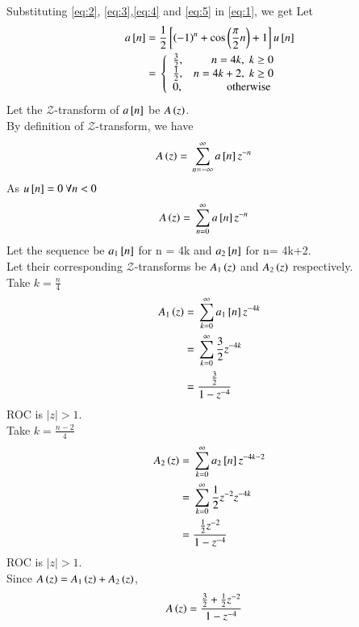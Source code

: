 \documentclass[journal,12pt,twocolumn]{IEEEtran}
\begin{document}
Substituting \eqref{eq:2}, \eqref{eq:3},\eqref{eq:4} and \eqref{eq:5} in \eqref{eq:1}, we get 
Let 
\begin{align}
\label{eq:6}
a{}\left[n\right] ={}& \frac{1}{2}{}\left[\left(-1\right)^{n} + \cos\left(\frac{\pi}{2} n\right) + 1\right]u{}\left[n\right]\\
\label{eq:7}
={}& \left\{
  \begin{array}{lr} 
      \frac{3}{2}, & n = 4k,\; k\geq 0 \\
      \frac{1}{2}, & n = 4k+2,\; k \geq 0 \\
      0, & \text{ otherwise }
      \end{array}
\right.
\end{align}
Let the $\mathcal{Z}$-transform of $a{}\left[n\right]$ be $A\left(z\right)$.\\
By definition of $\mathcal{Z}$-transform, we have
\begin{align}
\label{eq:8}
A\left(z\right)={}& \sum_{n=-\infty}^\infty a{}\left[n\right]z^{-n}
\end{align}
As $u{}\left[n\right] = 0\: \forall n< 0$
\begin{align}
\label{eq:9}
A\left(z\right)={}& \sum_{n=0}^\infty a{}\left[n\right]z^{-n}
\end{align}
Let the sequence be $a_{1}{}\left[n\right]$ for n = 4k and $a_{2}{}\left[n\right]$ for n= 4k+2. \\
Let their corresponding $\mathcal{Z}$-transforms be $A_{1}\left(z\right)$ and $A_{2}\left(z\right)$ respectively.\\
Take $k=\frac{n}{4}$
\begin{align}
\label{eq:10}
A_{1}\left(z\right) = {}& \sum_{k=0}^\infty a_{1}{}\left[n\right]z^{-4k}\\
\label{eq:11}
={}& \sum_{k=0}^\infty \frac{3}{2}z^{-4k}\\
\label{eq:12}
={}& \frac{\frac{3}{2}}{1-z^{-4}}
\end{align}
ROC is $|z|>1$.\\
Take $k=\frac{n-2}{4}$
\begin{align}
\label{eq:13}
A_{2}\left(z\right) = {}& \sum_{k=0}^\infty a_{2}{}\left[n\right]z^{-4k-2}\\
\label{eq:14}
={}& \sum_{k=0}^\infty \frac{1}{2}z^{-2}z^{-4k}\\
\label{eq:15}
={}& \frac{\frac{1}{2}z^{-2}}{1-z^{-4}}
\end{align}
ROC is $|z|>1$.\\
Since $A\left(z\right)= A_{1}\left(z\right) + A_{2}\left(z\right)$,
\begin{align}
A\left(z\right) ={}& \frac{\frac{3}{2}+\frac{1}{2}z^{-2}}{1-z^{-4}}
\end{align}
\end{document}
